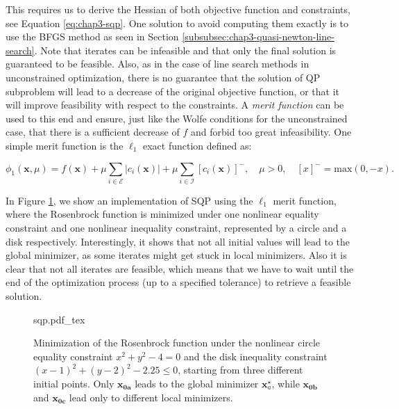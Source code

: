 This requires us to derive the Hessian of both objective function and
constraints, see Equation \ref{eq:chap3-sqp}. One solution to avoid
computing them exactly is to use the BFGS method as seen in Section
\ref{subsubsec:chap3-quasi-newton-line-search}. Note that iterates can
be infeasible and that only the final solution is guaranteed to be
feasible. Also, as in the case of line search methods in unconstrained
optimization, there is no guarantee that the solution of QP subproblem
will lead to a decrease of the original objective function, or that it
will improve feasibility with respect to the constraints. A
\emph{merit function} can be used to this end and ensure, just like
the Wolfe conditions for the unconstrained case, that there is a
sufficient decrease of $f$ \emph{} and forbid too great
infeasibility. One simple merit function is the $\ell_1$ exact
function defined as:

\begin{equation}
  \phi_1(\mathbf{x},\mu)= f(\mathbf{x}) +
  \mu\sum_{i\in\mathcal{E}}|c_i(\mathbf{x})| +
  \mu\sum_{i\in\mathcal{I}}[c_i(\mathbf{x})]^-, \quad\mu>0,
  \quad[x]^-=\text{max}(0,-x).
\end{equation}

In Figure \ref{fig:chap3-sqp}, we show an implementation of SQP using
the $\ell_1$ merit function, where the Rosenbrock function is
minimized under one nonlinear equality constraint and one nonlinear
inequality constraint, represented by a circle and a disk
respectively. Interestingly, it shows that not all initial values will
lead to the global minimizer, as some iterates might get stuck in
local minimizers. Also it is clear that not all iterates are feasible,
which means that we have to wait until the end of the optimization
process (up to a specified tolerance) to retrieve a feasible solution.

\begin{figure}
  \centering
      {\def\svgwidth{0.8\linewidth}
        {\footnotesize
          
                     {sqp.pdf_tex}
        }
      }
      \caption{Minimization of the Rosenbrock function under the
        nonlinear circle equality constraint $x^2+y^2-4=0$ and the
        disk inequality constraint $(x-1)^2+(y-2)^2-2.25 \le 0$,
        starting from three different initial points. Only
        $\mathbf{x_{0a}}$ leads to the global minimizer
        $\mathbf{x}_a^\star$, while $\mathbf{x_{0b}}$ and
        $\mathbf{x_{0c}}$ lead only to different local minimizers.}
      \label{fig:chap3-sqp}
\end{figure}

